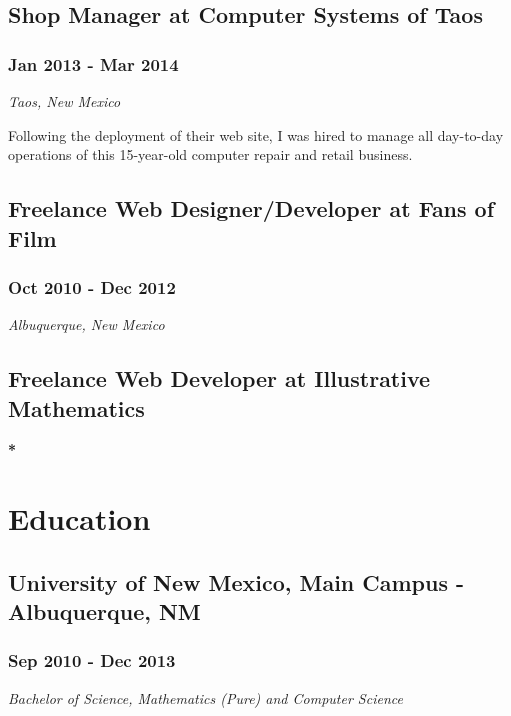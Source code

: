\documentclass[letterpaper]{article}
\begin{document}
\subsection{Shop Manager at Computer Systems of Taos}
\label{sec-3-4}
\subsubsection{Jan 2013 - Mar 2014}
\label{sec-3-4-1}
\emph{Taos, New Mexico}\\
\vspace{0.1in}

Following the deployment of their web site, I was hired to manage all day-to-day operations of this 15-year-old computer repair and retail business.

\subsection{Freelance Web Designer/Developer at Fans of Film}
\label{sec-3-5}
\subsubsection{Oct 2010 - Dec 2012}
\label{sec-3-5-1}
\emph{Albuquerque, New Mexico}\\
\vspace{0.1in}

\subsection{Freelance Web Developer at Illustrative Mathematics}
\label{sec-3-6}
\textbf{\textbf{*}}

\section{Education}
\label{sec-4}

\subsection{University of New Mexico, Main Campus - Albuquerque, NM}
\label{sec-4-1}
\subsubsection{Sep 2010 - Dec 2013}
\label{sec-4-1-1}
\emph{Bachelor of Science, Mathematics (Pure) and Computer Science}
\end{document}
